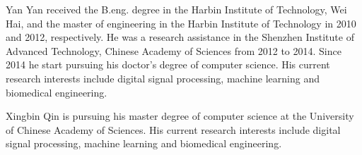 \documentclass[journal]{IEEEtran}
\begin{document}
  
  

% 

\begin{IEEEbiography}{Yan Yan}
received the B.eng. degree in the Harbin Institute of Technology, Wei Hai, and the master of engineering in the Harbin Institute of Technology in 2010 and 2012, respectively. He was a research assistance in the Shenzhen Institute of Advanced Technology, Chinese Academy of Sciences from 2012 to 2014. Since 2014 he start pursuing his doctor's degree of computer science. His current research interests include digital signal processing, machine learning and biomedical engineering.
\end{IEEEbiography} 

\begin{IEEEbiography}{Xingbin Qin}
is pursuing his master degree of computer science at the University of Chinese Academy of Sciences. His current research interests include digital signal processing, machine learning and biomedical engineering.
\end{IEEEbiography}
\end{document}
